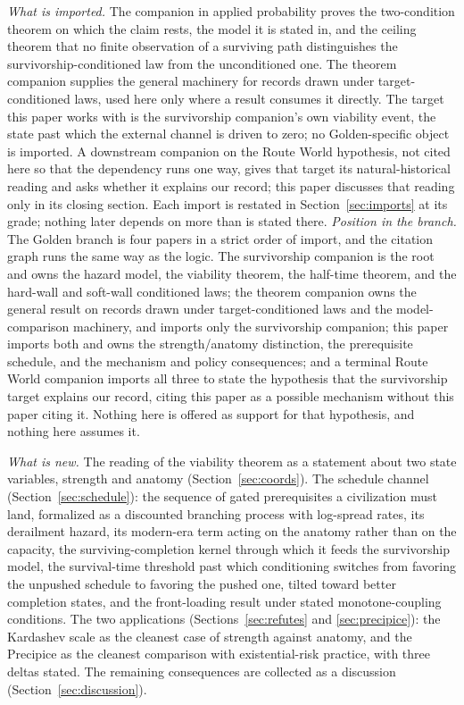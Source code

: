 \emph{What is imported.} The companion in applied probability
\cite{GoldenSurvivorship} proves the two-condition theorem on which the claim rests,
the model it is stated in, and the ceiling theorem that no finite
observation of a surviving path distinguishes the survivorship-conditioned
law from the unconditioned one. The theorem companion \cite{GoldenTargeted} supplies the general
machinery for records drawn under target-conditioned laws, used here
only where a result consumes it directly. The target this paper works with is the survivorship companion's own
viability event, the state past which the external channel is driven to
zero; no Golden-specific object is imported. A downstream companion on
the Route World hypothesis, not cited here so that the dependency runs
one way, gives that target its natural-historical reading and asks
whether it explains our record; this paper discusses that reading only
in its closing section. Each import is restated in
Section~\ref{sec:imports} at its grade; nothing later depends on more
than is stated there.
\emph{Position in the branch.} The Golden branch is four papers in a
strict order of import, and the citation graph runs the same way as the
logic. The survivorship companion \cite{GoldenSurvivorship} is the root and owns the
hazard model, the viability theorem, the half-time theorem, and the
hard-wall and soft-wall conditioned laws; the theorem companion
\cite{GoldenTargeted} owns the general result on records drawn under
target-conditioned laws and the model-comparison machinery, and imports
only the survivorship companion; this paper imports both and owns the
strength/anatomy distinction, the prerequisite schedule, and the
mechanism and policy consequences; and a terminal Route World companion
imports all three to state the hypothesis that the survivorship target
explains our record, citing this paper as a possible mechanism without
this paper citing it. Nothing here is offered as support for that
hypothesis, and nothing here assumes it.

\emph{What is new.} The reading of the viability theorem as a statement
about two state variables, strength and anatomy
(Section~\ref{sec:coords}). The schedule channel
(Section~\ref{sec:schedule}): the sequence of gated prerequisites a
civilization must land, formalized as a discounted branching process
with log-spread rates, its derailment hazard, its modern-era term acting
on the anatomy rather than on the capacity, the surviving-completion
kernel through which it feeds the survivorship model, the survival-time
threshold past which conditioning switches from favoring the unpushed
schedule to favoring the pushed one, tilted toward better completion states, and the front-loading
result under stated monotone-coupling conditions. The two applications
(Sections~\ref{sec:refutes} and \ref{sec:precipice}): the Kardashev
scale as the cleanest case of strength against anatomy, and the
Precipice as the cleanest comparison with existential-risk practice,
with three deltas stated. The remaining consequences are collected as a
discussion (Section~\ref{sec:discussion}).


